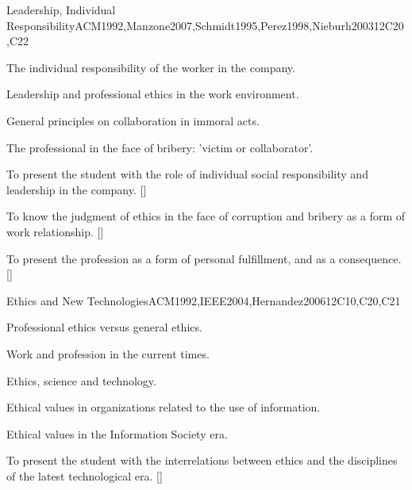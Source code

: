 \begin{syllabus}
\begin{unit}{}{Leadership, Individual Responsibility}{ACM1992,Manzone2007,Schmidt1995,Perez1998,Nieburh2003}{12}{C20,C22}
\begin{topics}
	\item The individual responsibility of the worker in the company.
	\item Leadership and professional ethics in the work environment.
	\item General principles on collaboration in immoral acts.
	\item The professional in the face of bribery: 'victim or collaborator'.

\end{topics}
\begin{learningoutcomes}
	\item To present the student with the role of individual social responsibility and leadership in the company. [\Familiarity]
	\item To know the judgment of ethics in the face of corruption and bribery as a form of work relationship. [\Familiarity]
	\item To present the profession as a form of personal fulfillment, and as a consequence. []
\end{learningoutcomes}
\end{unit}

\begin{unit}{}{Ethics and New Technologies}{ACM1992,IEEE2004,Hernandez2006}{12}{C10,C20,C21}
\begin{topics}
	\item Professional ethics versus general ethics.
	\item Work and profession in the current times.
	\item Ethics, science and technology.
	\item Ethical values in organizations related to the use of information.
	\item Ethical values in the Information Society era.
\end{topics}
\begin{learningoutcomes}
	\item To present the student with the interrelations between ethics and the disciplines of the latest technological era. [\Familiarity]
\end{learningoutcomes}
\end{unit}


\end{syllabus}
